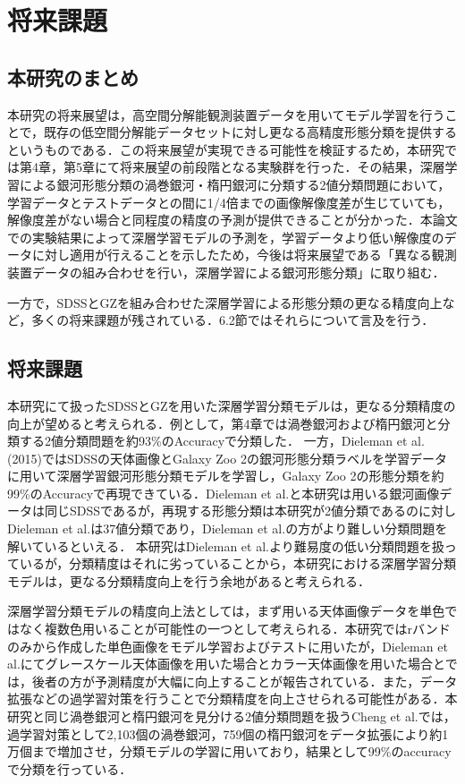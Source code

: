 \documentclass[a4j, 11pt]{jreport}
\begin{document}
\newpage
\chapter{将来課題}
\section{本研究のまとめ}
本研究の将来展望は，高空間分解能観測装置データを用いてモデル学習を行うことで，既存の低空間分解能データセットに対し更なる高精度形態分類を提供するというものである．この将来展望が実現できる可能性を検証するため，本研究では第4章，第5章にて将来展望の前段階となる実験群を行った．その結果，深層学習による銀河形態分類の渦巻銀河・楕円銀河に分類する2値分類問題において，学習データとテストデータとの間に1/4倍までの画像解像度差が生じていても，解像度差がない場合と同程度の精度の予測が提供できることが分かった．本論文での実験結果によって深層学習モデルの予測を，学習データより低い解像度のデータに対し適用が行えることを示したため，今後は将来展望である「異なる観測装置データの組み合わせを行い，深層学習による銀河形態分類」に取り組む．

一方で，SDSSとGZを組み合わせた深層学習による形態分類の更なる精度向上など，多くの将来課題が残されている．6.2節ではそれらについて言及を行う．

\section{将来課題}
本研究にて扱ったSDSSとGZを用いた深層学習分類モデルは，更なる分類精度の向上が望めると考えられる．例として，第4章では渦巻銀河および楕円銀河と分類する2値分類問題を約93\%のAccuracyで分類した．
一方，Dieleman et al.(2015)\cite{Dieleman2015}ではSDSSの天体画像とGalaxy Zoo 2の銀河形態分類ラベルを学習データに用いて深層学習銀河形態分類モデルを学習し，Galaxy Zoo 2の形態分類を約99\%のAccuracyで再現できている．Dieleman et al.と本研究は用いる銀河画像データは同じSDSSであるが，再現する形態分類は本研究が2値分類であるのに対しDieleman et al.は37値分類であり，Dieleman et al.の方がより難しい分類問題を解いているといえる．
本研究はDieleman et al.より難易度の低い分類問題を扱っているが，分類精度はそれに劣っていることから，本研究における深層学習分類モデルは，更なる分類精度向上を行う余地があると考えられる．

深層学習分類モデルの精度向上法としては，まず用いる天体画像データを単色ではなく複数色用いることが可能性の一つとして考えられる．本研究ではrバンドのみから作成した単色画像をモデル学習およびテストに用いたが，Dieleman et al.にてグレースケール天体画像を用いた場合とカラー天体画像を用いた場合とでは，後者の方が予測精度が大幅に向上することが報告されている．また，データ拡張などの過学習対策を行うことで分類精度を向上させられる可能性がある．本研究と同じ渦巻銀河と楕円銀河を見分ける2値分類問題を扱うCheng et al.では，過学習対策として2,103個の渦巻銀河，759個の楕円銀河をデータ拡張により約1万個まで増加させ，分類モデルの学習に用いており，結果として99\%のaccuracyで分類を行っている．
\end{document}
